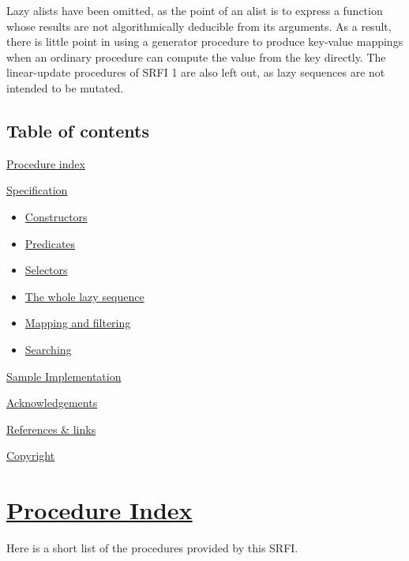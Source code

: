 Lazy alists have been omitted, as the point of an alist is to express a
function whose results are not algorithmically deducible from its
arguments. As a result, there is little point in using a generator
procedure to produce key-value mappings when an ordinary procedure can
compute the value from the key directly. The linear-update procedures of
SRFI 1 are also left out, as lazy sequences are not intended to be
mutated.

\subsection{Table of contents}\label{table-of-contents}

\protect\hyperlink{ProcedureIndex}{Procedure index}

\protect\hyperlink{Specification}{Specification}

\begin{itemize}
\tightlist
\item
  \protect\hyperlink{Constructors}{Constructors}
\item
  \protect\hyperlink{Predicates}{Predicates}
\item
  \protect\hyperlink{Selectors}{Selectors}
\item
  \protect\hyperlink{Whole}{The whole lazy sequence}
\item
  \protect\hyperlink{MappingFiltering}{Mapping and filtering}
\item
  \protect\hyperlink{Searching}{Searching}
\end{itemize}

\protect\hyperlink{SampleImplementation}{Sample Implementation}

\protect\hyperlink{Acknowledgements}{Acknowledgements}

\protect\hyperlink{ReferencesLinks}{References \& links}

\protect\hyperlink{Copyright}{Copyright}

\section{\texorpdfstring{\href{}{Procedure
Index}}{Procedure Index}}\label{procedure-index}

Here is a short list of the procedures provided by this SRFI.

